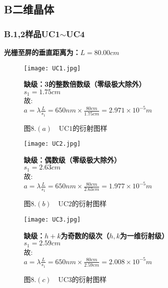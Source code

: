 \documentclass{ctexart}
\begin{document}
\subsection*{B\quad 二维晶体}
\subsubsection*{B.1,2\quad 样品UC1$\sim$UC4}
\noindent \textbf{光栅至屏的垂直距离为：$L=80.00cm$}
\begin{figure}[htbp]
  \begin{minipage}[c]{0.43\linewidth}
    \texttt{[image: UC1.jpg]}
    \caption*{图$8.(a)\quad \mathrm{UC1}$的衍射图样}
    \end{minipage}
    \hspace{1.2cm}
    \begin{minipage}[c]{0.6\linewidth}
      \textbf{缺级：3的整数倍数级（零级极大除外）}\\
      \noindent $s_1=1.75cm$\\
      故:\\
      $a=\lambda\frac{L}{s_1}=650nm\times \frac{80cm}{1.75cm}=2.971\times 10^{-5}m$
    \end{minipage}
\end{figure}
\begin{figure}[htbp]
  \begin{minipage}[c]{0.43\linewidth}
    \texttt{[image: UC2.jpg]}
    \caption*{图$8.(b)\quad \mathrm{UC2}$的衍射图样}
    \end{minipage}
    \hspace{1.2cm}
    \begin{minipage}[c]{0.6\linewidth}
      \noindent \textbf{缺级：偶数级（零级极大除外）}\\
      $s_1=2.63cm$\\
      故:\\
      $a=\lambda\frac{L}{s_1}=650nm\times \frac{80cm}{2.63cm}=1.977\times 10^{-5}m$\\
    \end{minipage}
\end{figure}
\begin{figure}[htbp]
  \begin{minipage}[c]{0.43\linewidth}
    \texttt{[image: UC3.jpg]}
    \caption*{图$8.(c)\quad \mathrm{UC3}$的衍射图样}
    \end{minipage}
    \hspace{1.2cm}
    \begin{minipage}[c]{0.6\linewidth}
      \noindent \textbf{缺级：$h+k$为奇数的级次（$h,k$为一维衍射级）}\\
      $s_1=2.59cm$\\
      故:\\
      $a=\lambda\frac{L}{s_1}=650nm\times \frac{80cm}{2.59cm}=2.008\times 10^{-5}m$
    \end{minipage}
\end{figure}
\end{document}
